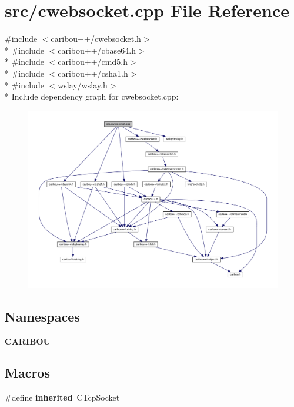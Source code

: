 \section{src/cwebsocket.cpp File Reference}
\label{cwebsocket_8cpp}
{\ttfamily \#include $<$caribou++/cwebsocket.\-h$>$}\\*
{\ttfamily \#include $<$caribou++/cbase64.\-h$>$}\\*
{\ttfamily \#include $<$caribou++/cmd5.\-h$>$}\\*
{\ttfamily \#include $<$caribou++/csha1.\-h$>$}\\*
{\ttfamily \#include $<$wslay/wslay.\-h$>$}\\*
Include dependency graph for cwebsocket.\-cpp\-:\nopagebreak
\begin{figure}[H]
\begin{center}
\leavevmode
\includegraphics[width=350pt]{cwebsocket_8cpp__incl}
\end{center}
\end{figure}
\subsection*{Namespaces}
\begin{DoxyCompactItemize}
\item 
{\bf C\-A\-R\-I\-B\-O\-U}
\end{DoxyCompactItemize}
\subsection*{Macros}
\begin{DoxyCompactItemize}
\item 
\#define {\bf inherited}~C\-Tcp\-Socket
\end{DoxyCompactItemize}


